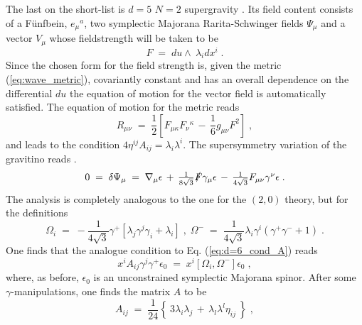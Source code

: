 \documentclass[a4paper,12pt]{article}
\begin{document}
\par
The last on the short-list is $d=5$ $N=2$ supergravity \cite{art:cremmer}.
Its field content consists of a F\"unfbein, $e_{\mu}{}^{a}$,
two symplectic Majorana Rarita-Schwinger fields $\Psi_{\mu}$
and a vector $V_{\mu}$ whose fieldstrength will be taken to be
\begin{equation}
 F \;=\; du\wedge\ \lambda_{i}dx^{i} \; .
\end{equation}
Since the chosen form for the field strength is, given the metric (\ref{eq:wave_metric}),
covariantly constant and has an overall dependence on the differential $du$ the equation
of motion for the vector field is automatically satisfied. The equation of motion for the
metric reads
\begin{equation}
 R_{\mu\nu} \;=\; \textstyle{\frac{1}{2}}\left[
                     F_{\mu\kappa}F_{\nu}{}^{\kappa}\,-\,
                     \textstyle{\frac{1}{6}}g_{\mu\nu}F^{2}
                  \right] \; ,
\end{equation}
and leads to the condition $4\eta^{ij}A_{ij}=\lambda_{i}\lambda^{i}$. 
The supersymmetry variation of the gravitino reads \cite{art:cremmer}.
\begin{equation}
 0\;=\; \delta\Psi_{\mu}\;=\;
 \nabla_{\mu}\epsilon \,+\,
 \textstyle{\frac{1}{8\sqrt{3}}} \slashed{F}\gamma_{\mu}\epsilon \,-\,
 \textstyle{\frac{1}{4\sqrt{3}}} F_{\mu\nu}\gamma^{\nu}\epsilon \; .
\end{equation}
The analysis is completely analogous to the one for the $(2,0)$ theory,
but for the definitions
\begin{equation}
\Omega_{i} \;=\; -\textstyle{\frac{1}{4\sqrt{3}}}\gamma^{+}
                 \left[
                     \lambda_{j}\gamma^{j}\gamma_{i}+\lambda_{i}
                 \right] \; ,\;
\Omega^{-} \;=\; \textstyle{\frac{1}{4\sqrt{3}}}\lambda_{i}\gamma^{i}
               \left(
                  \gamma^{+}\gamma^{-}+1
               \right) \; .
\end{equation}
One finds that the analogue condition to Eq. (\ref{eq:d=6_cond_A}) reads
\begin{equation}
 x^{i}A_{ij}\gamma^{j}\gamma^{+}\epsilon_{0} \;=\; x^{i}\left[
                                \Omega_{i},\Omega^{-}
                                  \right] \epsilon_{0} \; ,
\end{equation}
where, as before, $\epsilon_{0}$ is an unconstrained symplectic Majorana spinor.
After some $\gamma$-manipulations, one finds the matrix $A$ to be
\begin{equation}
 A_{ij} \;=\; \textstyle{\frac{1}{24}}\left\{ \ 3\lambda_{i}\lambda_{j}\,+\,
                                                \lambda_{l}\lambda^{l}\eta_{ij}
                                      \ \right\} \; ,
\end{equation}
\end{document}
